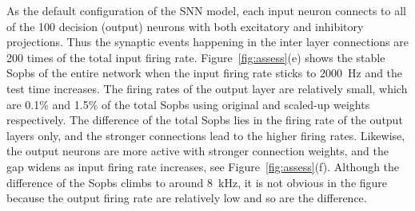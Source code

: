 \documentclass{frontiersENG} %
\begin{document}
As the default configuration of the SNN model, each input neuron connects to all of the 100 decision (output) neurons with both excitatory and inhibitory projections.
Thus the synaptic events happening in the inter layer connections are 200 times of the total input firing rate.
Figure~\ref{fig:assess}(e) shows the stable Sopbs of the entire network when the input firing rate sticks to 2000~Hz and the test time increases.
The firing rates of the output layer are relatively small, which are 0.1\% and 1.5\% of the total Sopbs using original and scaled-up weights respectively.
The difference of the total Sopbs lies in the firing rate of the output layers only, and the stronger connections lead to the higher firing rates.
Likewise, the output neurons are more active with stronger connection weights, and the gap widens as input firing rate increases, see Figure~\ref{fig:assess}(f).
Although the difference of the Sopbs climbs to around 8~kHz, it is not obvious in the figure because the output firing rate are relatively low and so are the difference.
\end{document}
